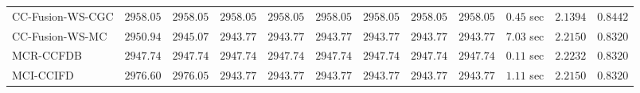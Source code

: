 \begin{table}[H]
\begin{tabular}{lrrrrrrrrrrr}
    CC-Fusion-WS-CGC & $      2958.05$ & $      2958.05$ & $      2958.05$ & $      2958.05$ & $      2958.05$ & $      2958.05$ & $      2958.05$ & $      2958.05$ & $         0.45$ sec    & $       2.1394$  & $       0.8442$ \\ 
     CC-Fusion-WS-MC & $      2950.94$ & $      2945.07$ & $      2943.77$ & $      2943.77$ & $      2943.77$ & $      2943.77$ & $      2943.77$ & $      2943.77$ & $         7.03$ sec    & $       2.2150$  & $       0.8320$ \\ 
\cmidrule{1-1} 
           MCR-CCFDB & $      2947.74$ & $      2947.74$ & $      2947.74$ & $      2947.74$ & $      2947.74$ & $      2947.74$ & $      2947.74$ & $      2947.74$ & $         0.11$ sec    & $       2.2232$  & $       0.8320$ \\ 
\cmidrule{1-1} 
           MCI-CCIFD & $      2976.60$ & $      2976.05$ & $      2943.77$ & $      2943.77$ & $      2943.77$ & $      2943.77$ & $      2943.77$ & $      2943.77$ & $         1.11$ sec    & $       2.2150$  & $       0.8320$ \\ 
\bottomrule
\end{tabular}
\end{table}

